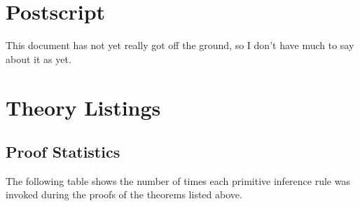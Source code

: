 
\section{Postscript}\label{POSTSCRIPT}

This document has not yet really got off the ground, so I don't have much to say about it as yet.

\pagebreak

\appendix

\section{Theory Listings}

{
\let\Section\subsection
\let\Subsection\subsubsection
\def\subsection#1{\Subsection*{#1}}

\def\section#1{\Section{#1}\label{t049a}\index{t049a}}


%
}  %

\pagebreak
\subsection{Proof Statistics}

The following table shows the number of times each primitive inference rule was invoked during the proofs of the theorems listed above.

\begin{centering}
\hfill
{\underscoreoff
\begin{tabular}{| l | l |}
\hline

\end{tabular}
}%
\hfill
\end{centering}

